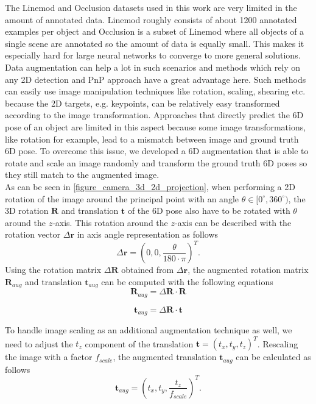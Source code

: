 \documentclass[twocolumn, 10pt, letterpaper]{article}
\begin{document}
The Linemod\cite{Linemod} and Occlusion\cite{Occlusion} datasets used in this work are very limited in the amount of annotated data. Linemod roughly consists of about 1200 annotated examples per object and Occlusion is a subset of Linemod where all objects of a single scene are annotated so the amount of data is equally small. This makes it especially hard for large neural networks to converge to more general solutions. Data augmentation can help a lot in such scenarios\cite{RandAugment}\cite{AmoebaNet_NAS_FPN} and methods which rely on any 2D detection and PnP approach have a great advantage here. Such methods can easily use image manipulation techniques like rotation, scaling, shearing etc. because the 2D targets, e.g. keypoints, can be relatively easy transformed according to the image transformation. Approaches that directly predict the 6D pose of an object are limited in this aspect because some image transformations, like rotation for example, lead to a mismatch between image and ground truth 6D pose. To overcome this issue, we developed a 6D augmentation that is able to rotate and scale an image randomly and transform the ground truth 6D poses so they still match to the augmented image.\\
As can be seen in \autoref{figure_camera_3d_2d_projection}, when performing a 2D rotation of the image around the principal point with an angle $\theta \in [0^{\circ}, 360^{\circ})$, the 3D rotation $\mathbf{R}$ and translation $\mathbf{t}$ of the 6D pose also have to be rotated with $\theta$ around the $z$-axis. This rotation around the $z$-axis can be described with the rotation vector $\Delta \mathbf{r}$ in axis angle representation as follows
\begin{equation}
\label{equation_aug_delta_r}
\Delta \mathbf{r} = (0, 0, \frac{\theta}{180 \cdot \pi})^T.
\end{equation}
Using the rotation matrix $\Delta \mathbf{R}$ obtained from $\Delta \mathbf{r}$, the augmented rotation matrix $\mathbf{R}_{aug}$ and translation $\mathbf{t}_{aug}$ can be computed with the following equations
\begin{equation}
\label{equation_r_aug}
\mathbf{R}_{aug} = \Delta \mathbf{R} \cdot \mathbf{R}
\end{equation}

\begin{equation}
\label{equation_t_aug}
\mathbf{t}_{aug} = \Delta \mathbf{R} \cdot \mathbf{t}
\end{equation}

To handle image scaling as an additional augmentation technique as well, we need to adjust the $t_z$ component of the translation $\mathbf{t} = (t_x, t_y, t_z)^T$. Rescaling the image with a factor $f_{scale}$, the augmented translation $\mathbf{t}_{aug}$ can be calculated as follows
\begin{equation}
\label{equation_t_aug_scale}
\mathbf{t}_{aug} = (t_x, t_y, \frac{t_z}{f_{scale}})^T.
\end{equation}
\end{document}
